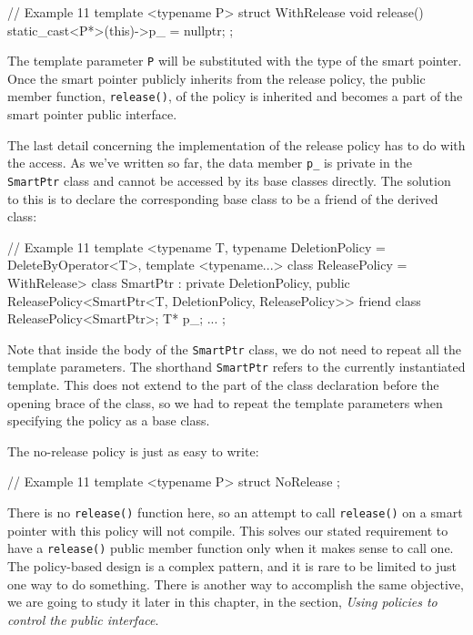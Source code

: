 \begin{code}
// Example 11
template <typename P> struct WithRelease {
  void release() { static_cast<P*>(this)->p_ = nullptr; }
};
\end{code}

The template parameter \texttt{P} will be substituted with the type of the smart pointer. Once the smart pointer publicly inherits from the release policy, the public member function, \texttt{release()}, of the policy is inherited and becomes a part of the smart pointer public interface.

The last detail concerning the implementation of the release policy has to do with the access. As we've written so far, the data member \texttt{p\_} is private in the \texttt{SmartPtr} class and cannot be accessed by its base classes directly. The solution to this is to declare the corresponding base class to be a friend of the derived class:

\begin{code}
// Example 11
template <typename T,
          typename DeletionPolicy = DeleteByOperator<T>,
          template <typename...> class ReleasePolicy =
                                       WithRelease>
class SmartPtr : private DeletionPolicy,
  public ReleasePolicy<SmartPtr<T, DeletionPolicy,
                                   ReleasePolicy>>
{
  friend class ReleasePolicy<SmartPtr>;
  T* p_;
  ...
};
\end{code}

Note that inside the body of the \texttt{SmartPtr} class, we do not need to repeat all the template parameters. The shorthand \texttt{SmartPtr} refers to the currently instantiated template. This does not extend to the part of the class declaration before the opening brace of the class, so we had to repeat the template parameters when specifying the policy as a base class.

The no-release policy is just as easy to write:

\begin{code}
// Example 11
template <typename P> struct NoRelease {};
\end{code}

There is no \texttt{release()} function here, so an attempt to call \texttt{release()} on a smart pointer with this policy will not compile. This solves our stated requirement to have a \texttt{release()} public member function only when it makes sense to call one. The policy-based design is a complex pattern, and it is rare to be limited to just one way to do something. There is another way to accomplish the same objective, we are going to study it later in this chapter, in the section, \emph{Using policies to control the} \emph{public interface}.

